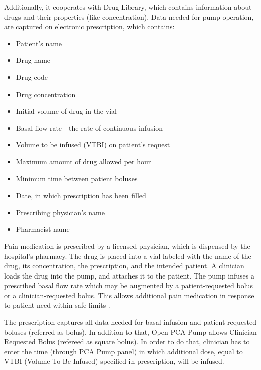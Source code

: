 Additionally, it cooperates with Drug Library, which contains information about drugs and their properties (like concentration). Data needed for pump operation, are captured on electronic prescription, which contains:
\begin{itemize}
    \item Patient's name
    \item Drug name
    \item Drug code
    \item Drug concentration
    \item Initial volume of drug in the vial
    \item Basal flow rate - the rate of continuous infusion
    \item Volume to be infused (VTBI) on patient's request
    \item Maximum amount of drug allowed per hour
    \item Minimum time between patient boluses
    \item Date, in which prescription has been filled
    \item Prescribing physician's name
    \item Pharmacist name
\end{itemize}

Pain medication is prescribed by a licensed physician, which is dispensed by the hospital's pharmacy. The drug is placed into a vial labeled with the name of the drug, its concentration, the prescription, and the intended patient. A clinician loads the drug into the pump, and attaches it to the patient. The pump infuses a prescribed basal flow rate which may be augmented by a patient-requested bolus or a clinician-requested bolus. This allows additional pain medication in response to patient need within safe limits \cite{PcaReq}.

The prescription captures all data needed for basal infusion and patient requested boluses (referred as bolus). In addition to that, Open PCA Pump allows Clinician Requested Bolus (refereed as square bolus). In order to do that, clinician has to enter the time (through PCA Pump panel) in which additional dose, equal to VTBI (Volume To Be Infused) specified in prescription, will be infused.

